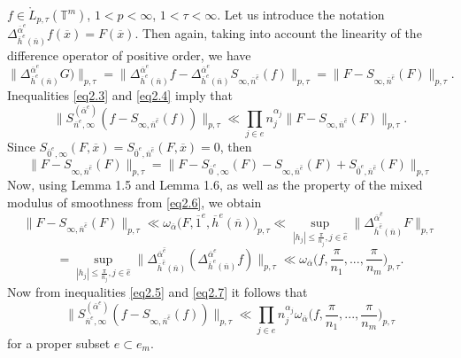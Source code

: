 \documentclass[12pt]{article}
\theoremstyle{plain}
\begin{document}
 $f\in {\mathring L}_{p, \tau}(\mathbb{T}^{m})$, $1< p<\infty$, $1< \tau < \infty$.
Let us introduce the notation 
 $\Delta_{\overline{h}^{e}(\overline{n})}^{\overline{\alpha}^{e}}f(\overline{x})=F(\overline{x})$.  Then again, taking into account the linearity of the difference operator of positive order, we have
 \begin{equation}\label{eq2.4}
\|\Delta_{\overline{h}^{e}(\overline{n})}^{\overline{\alpha}^{e}}G) \|_{p, \tau}=\|\Delta_{\overline{h}^{e}(\overline{n})}^{\overline{\alpha}^{e}}f -\Delta_{\overline{h}^{e}(\overline{n})}^{\overline{\alpha}^{e}}S_{\infty, \overline{n}^{\hat{e}}}(f) \|_{p, \tau}=\|F-S_{\infty, \overline{n}^{\hat{e}}}(F) \|_{p, \tau}.
\end{equation}
Inequalities \eqref{eq2.3} and \eqref{eq2.4} imply that  
\begin{equation}\label{eq2.5}
\|S_{\overline{n}^{e}, \infty}^{(\overline{\alpha}^{e})}(f-S_{\infty, \overline{n}^{\hat{e}}}(f))\|_{p, \tau} \ll \prod_{j\in e}n_{j}^{\alpha_{j}}\|F-S_{\infty, \overline{n}^{\hat{e}}}(F) \|_{p, \tau}. 
\end{equation}
Since $S_{\overline{0}^{e}, \infty}(F, \overline{x})=S_{\overline{0}^{e}, \overline{n}^{\hat{e}}}(F, \overline{x})=0$, then
\begin{equation}\label{eq2.6}
\|F-S_{\infty, \overline{n}^{\hat{e}}}(F) \|_{p, \tau}=\|F-S_{\overline{0}^{e}, \infty}(F)-S_{\infty, \overline{n}^{\hat{e}}}(F) +S_{\overline{0}^{e}, \overline{n}^{\hat{e}}}(F)\|_{p, \tau}
\end{equation}
Now, using Lemma 1.5 and Lemma 1.6, as well as the property of the mixed modulus of smoothness from \eqref{eq2.6}, we obtain
\begin{equation*} 
\|F-S_{\infty, \overline{n}^{\hat{e}}}(F) \|_{p, \tau}  \ll  \omega_{\overline\alpha}\bigl(F, \overline{1}^{e},  \overline{h}^{e}(\overline{n}))_{p, \tau}  \ll \sup_{|h_{j}|\leqslant \frac{\pi}{n_{j}}, j\in \hat{e}}\|\Delta_{\overline{h}^{\hat{e}}(\overline{n})}^{\overline{\alpha}^{\hat{e}}}F\|_{p, \tau}
\end{equation*}
\begin{equation}\label{eq2.7}
 =\sup_{|h_{j}|\leqslant \frac{\pi}{n_{j}}, j\in \hat{e}}\|\Delta_{\overline{h}^{\hat{e}}(\overline{n})}^{\overline{\alpha}^{\hat{e}}}(\Delta_{\overline{h}^{e}(\overline{n})}^{\overline{\alpha}^{e}}f)\|_{p, \tau} \ll  \omega_{\overline\alpha}\bigl(f,\frac{\pi}{n_{1}},...,\frac{\pi}{n_{m}}\bigr)_{p, \tau}.
\end{equation}
Now from inequalities \eqref{eq2.5} and \eqref{eq2.7} it follows that
\begin{equation}\label{eq2.8}
\|S_{\overline{n}^{e}, \infty}^{(\overline{\alpha}^{e})}(f-S_{\infty, \overline{n}^{\hat{e}}}(f))\|_{p, \tau} \ll \prod_{j\in e}n_{j}^{\alpha_{j}}\omega_{\overline\alpha}\bigl(f,\frac{\pi}{n_{1}},...,\frac{\pi}{n_{m}}\bigr)_{p, \tau}
\end{equation}
for a proper subset $e \subset e_{m}$. 
\end{document}
